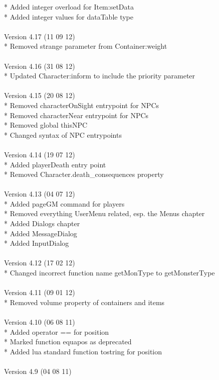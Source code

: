 \documentclass[a4paper,10pt,makeidx]{scrreprt}
\begin{document}
* Added integer overload for Item:setData\\
* Added integer values for dataTable type\\
\\
Version 4.17 (11 09 12)\\
* Removed strange parameter from Container:weight\\
\\
Version 4.16 (31 08 12)\\
* Updated Character:inform to include the priority parameter\\
\\
Version 4.15 (20 08 12)\\
* Removed characterOnSight entrypoint for NPCs\\
* Removed characterNear entrypoint for NPCs\\
* Removed global thisNPC\\
* Changed syntax of NPC entrypoints\\
\\
Version 4.14 (19 07 12)\\
* Added playerDeath entry point\\
* Removed Character.death\_consequences property\\ 
\\
Version 4.13 (04 07 12)\\
* Added pageGM command for players\\
* Removed everything UserMenu related, esp. the Menus chapter\\
* Added Dialogs chapter\\
* Added MessageDialog\\
* Added InputDialog\\
\\
Version 4.12 (17 02 12)\\
* Changed incorrect function name getMonType to getMonsterType\\
\\
Version 4.11 (09 01 12)\\
* Removed volume property of containers and items\\
\\
Version 4.10 (06 08 11)\\
* Added operator == for position\\
* Marked function equapos as deprecated\\
* Added lua standard function tostring for position\\
\\
Version 4.9 (04 08 11)\\
\end{document}
